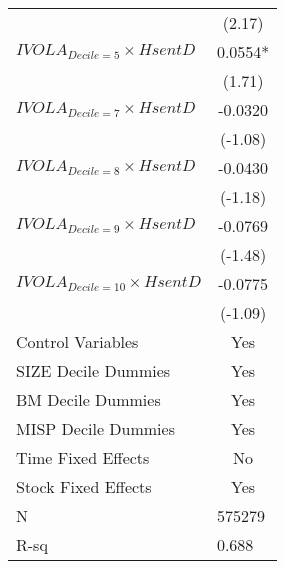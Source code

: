 \begin{tabular}{ll}
        & \multicolumn{1}{c}{(2.17)} \\
$IVOLA_{Decile = 5} \times HsentD$ & \multicolumn{1}{c}{0.0554*} \\
        & \multicolumn{1}{c}{(1.71)} \\
$IVOLA_{Decile = 7} \times HsentD$ & \multicolumn{1}{c}{-0.0320} \\
        & \multicolumn{1}{c}{(-1.08)} \\
$IVOLA_{Decile = 8} \times HsentD$ & \multicolumn{1}{c}{-0.0430} \\
        & \multicolumn{1}{c}{(-1.18)} \\
$IVOLA_{Decile = 9} \times HsentD$ & \multicolumn{1}{c}{-0.0769} \\
        & \multicolumn{1}{c}{(-1.48)} \\
$IVOLA_{Decile = 10} \times HsentD$ & \multicolumn{1}{c}{-0.0775} \\
        & \multicolumn{1}{c}{(-1.09)} \\
\midrule
Control Variables & \multicolumn{1}{c}{Yes} \\
SIZE Decile Dummies & \multicolumn{1}{c}{Yes} \\
BM Decile Dummies & \multicolumn{1}{c}{Yes} \\
MISP Decile Dummies & \multicolumn{1}{c}{Yes} \\
Time Fixed Effects & \multicolumn{1}{c}{No} \\
Stock Fixed Effects & \multicolumn{1}{c}{Yes} \\
N       & 575279 \\
R-sq    & 0.688 \\
\bottomrule
\end{tabular}%
